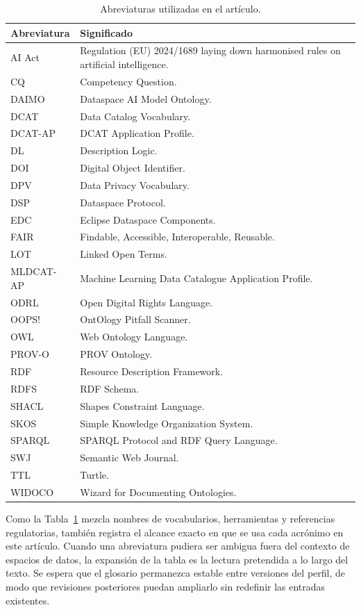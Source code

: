 \documentclass[Afour,sagev,times]{sagej}
\begin{document}
\begin{table}[tb]
\small\sf\centering
\caption{Abreviaturas utilizadas en el artículo.\label{tab:glossary}}
\begin{tabular}{@{}p{2.6cm}p{12.2cm}@{}}
\toprule
\textbf{Abreviatura} & \textbf{Significado} \\
\midrule
AI Act & Regulation (EU) 2024/1689 laying down harmonised rules on artificial intelligence. \\
CQ & Competency Question. \\
DAIMO & Dataspace AI Model Ontology. \\
DCAT & Data Catalog Vocabulary. \\
DCAT-AP & DCAT Application Profile. \\
DL & Description Logic. \\
DOI & Digital Object Identifier. \\
DPV & Data Privacy Vocabulary. \\
DSP & Dataspace Protocol. \\
EDC & Eclipse Dataspace Components. \\
FAIR & Findable, Accessible, Interoperable, Reusable. \\
LOT & Linked Open Terms. \\
MLDCAT-AP & Machine Learning Data Catalogue Application Profile. \\
ODRL & Open Digital Rights Language. \\
OOPS! & OntOlogy Pitfall Scanner. \\
OWL & Web Ontology Language. \\
PROV-O & PROV Ontology. \\
RDF & Resource Description Framework. \\
RDFS & RDF Schema. \\
SHACL & Shapes Constraint Language. \\
SKOS & Simple Knowledge Organization System. \\
SPARQL & SPARQL Protocol and RDF Query Language. \\
SWJ & Semantic Web Journal. \\
TTL & Turtle. \\
WIDOCO & Wizard for Documenting Ontologies. \\
\bottomrule
\end{tabular}
\end{table}

Como la Tabla~\ref{tab:glossary} mezcla nombres de vocabularios, herramientas y referencias regulatorias, también registra el alcance exacto en que se usa cada acrónimo en este artículo. Cuando una abreviatura pudiera ser ambigua fuera del contexto de espacios de datos, la expansión de la tabla es la lectura pretendida a lo largo del texto. Se espera que el glosario permanezca estable entre versiones del perfil, de modo que revisiones posteriores puedan ampliarlo sin redefinir las entradas existentes.
\end{document}
